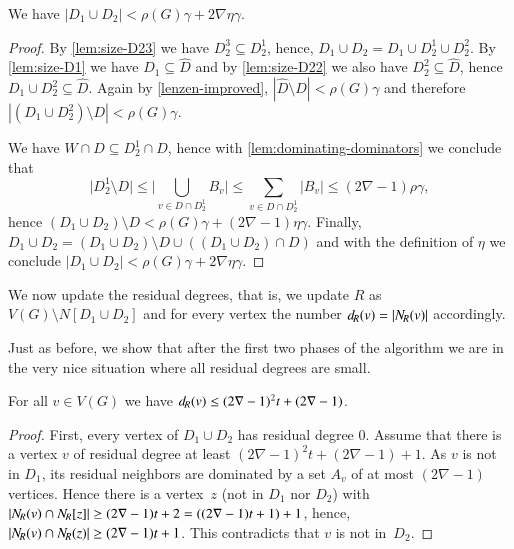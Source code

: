 \smallskip
\begin{lemma}\label{lem:size-D12}
  We have $|D_1\cup D_2| < \rho(G)\gamma+2\nabla\eta\gamma$.
\end{lemma}
\begin{proof}
  By \cref{lem:size-D23} we have $D_2^3\subseteq D_2^1$, hence,
  $D_1\cup D_2=D_1\cup D_2^1\cup D_2^2$. By \cref{lem:size-D1} we have
  $D_1 \subseteq \hat D$ and by \cref{lem:size-D22} we also have
  $D_2^2 \subseteq \hat D$, hence $D_1\cup D_2^2\subseteq \hat D$.
  Again by \cref{lenzen-improved}, $|\hat D \setminus D|<\rho(G)\gamma$ and
  therefore $|(D_1 \cup D_2^2 )\setminus D| < \rho(G) \gamma$.

  We have $W\cap D\subseteq D_2^1\cap D$, hence with
  \cref{lem:dominating-dominators} we conclude that
  \[
    \big\vert D_2^1 \setminus D \big\vert \leq
    \Big\vert\bigcup\limits_{v\in D \cap D_2^1}B_v\Big\vert \leq
    \sum\limits_{v\in D \cap D_2^1} |B_v| \leq (2\nabla-1)\rho\gamma,
  \]
  hence $(D_1\cup D_2)\setminus D<\rho(G)\gamma+(2\nabla-1)\eta\gamma$. Finally,
  $D_1\cup D_2=(D_1\cup D_2)\setminus D\cup ((D_1\cup D_2)\cap D)$ and
  with the definition of $\eta$ we conclude
  $|D_1\cup D_2|<\rho(G)\gamma + 2\nabla\eta\gamma$.
\end{proof}

We now update the residual degrees, that is, we update $R$ as
$V(G)\setminus N[D_1\cup D_2]$ and for every vertex the number
$d_{\hspace{-1pt}R}(v)=|N_{\hspace{-1pt}R}(v)|$ accordingly.


Just as before, we show that after the first two phases of the algorithm we
are in the very nice situation where all residual degrees are
small. 

\begin{lemma}\label{lem:res-degree}
  For all $v\in V(G)$ we have $d_{\hspace{-1pt}R}(v)\leq (2\nabla-1)^2t+(2\nabla-1)$.
\end{lemma}
\begin{proof}
  First, every vertex of $D_1\cup D_2$ has residual degree $0$.
  Assume that there is a vertex $v$ of residual degree at least $(2\nabla-1)^2t+(2\nabla-1)+1$.
  As $v$ is not in $D_1$, its residual neighbors are
  dominated by a set $A_v$ of at most $(2\nabla-1)$ vertices. Hence there is a
  vertex~$z$ (not in $D_1$ nor $D_2$) with $|N_{\hspace{-1pt}R}(v)\cap N_{\hspace{-1pt}R}[z]|\geq (2\nabla-1)t+2 = ((2\nabla-1)t+1)+1$, hence, $|N_{\hspace{-1pt}R}(v)\cap N_{\hspace{-1pt}R}(z)|\geq (2\nabla-1)t+1$.
  This contradicts that $v$ is not in~$D_2$.
\end{proof}
